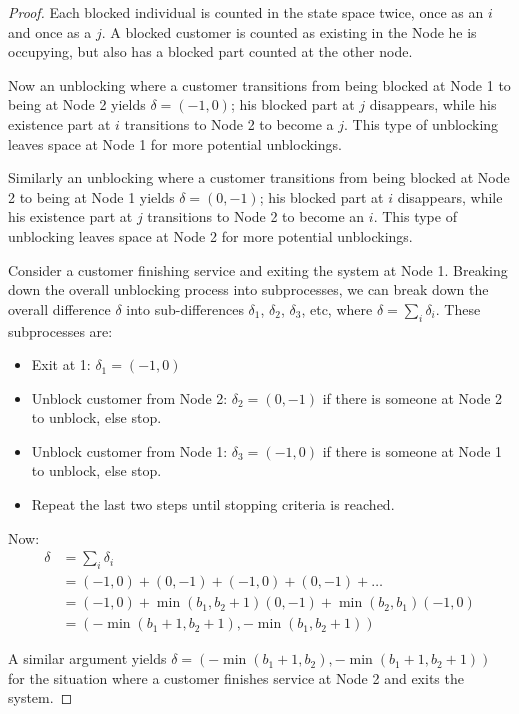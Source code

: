 \documentclass{article}
\begin{document}
\begin{proof}
  Each blocked individual is counted in the state space twice, once as an $i$ and once as a $j$. A blocked customer is counted as existing in the Node he is occupying, but also has a blocked part counted at the other node.

  Now an unblocking where a customer transitions from being blocked at Node 1 to being at Node 2 yields $\delta = (-1, 0)$; his blocked part at $j$ disappears, while his existence part at $i$ transitions to Node 2 to become a $j$.
  This type of unblocking leaves space at Node 1 for more potential unblockings.

  Similarly an unblocking where a customer transitions from being blocked at Node 2 to being at Node 1 yields $\delta = (0, -1)$; his blocked part at $i$ disappears, while his existence part at $j$ transitions to Node 2 to become an $i$.
  This type of unblocking leaves space at Node 2 for more potential unblockings.

  Consider a customer finishing service and exiting the system at Node 1.
  Breaking down the overall unblocking process into subprocesses, we can break down the overall difference $\delta$ into sub-differences $\delta_1$, $\delta_2$, $\delta_3$, etc, where $\delta = \sum_i \delta_i$.
  These subprocesses are:

  \begin{itemize}
    \item Exit at 1: $\delta_1 = (-1, 0)$
    \item Unblock customer from Node 2: $\delta_2 = (0, -1)$ if there is someone at Node 2 to unblock, else stop.
    \item Unblock customer from Node 1: $\delta_3 = (-1, 0)$ if there is someone at Node 1 to unblock, else stop.
    \item Repeat the last two steps until stopping criteria is reached.
  \end{itemize}

  Now:
  \begin{align*}
    \delta &= \sum_i \delta_i\\
    &= (-1, 0) + (0, -1) + (-1, 0) + (0, -1) + \dots\\
    &= (-1, 0) + \min(b_1, b_2+1)(0, -1) + \min(b_2, b_1)(-1, 0)\\
    &= (-\min(b_1+1, b_2+1), -\min(b_1, b_2+1))
  \end{align*}

  A similar argument yields $\delta = (-\min(b_1+1, b_2), -\min(b_1+1, b_2+1))$ for the situation where a customer finishes service at Node 2 and exits the system.

\end{proof}
\end{document}
